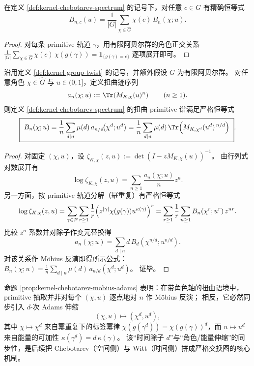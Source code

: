 \begin{proposition}\label{prop:kernel-chebotarev-fourier}
在定义 \ref{def:kernel-chebotarev-spectrum} 的记号下，对任意 $c\in G$ 有精确恒等式
\[
B_{n,c}(u)=\frac{1}{|G|}\sum_{\chi\in\widehat G}\overline{\chi(c)}\,B_n(\chi;u).
\]
\end{proposition}

\begin{proof}
对每条 primitive 轨道 $\gamma$，用有限阿贝尔群的角色正交关系
\(
\frac{1}{|G|}\sum_{\chi\in\widehat G}\overline{\chi(c)}\,\chi(g(\gamma))=\mathbf{1}_{\{g(\gamma)=c\}}
\)
逐项展开即可。
\end{proof}

\begin{proposition}\label{prop:kernel-chebotarev-mobius-adams}
沿用定义 \ref{def:kernel-group-twist} 的记号，并额外假设 \(G\) 为有限阿贝尔群。
对任意角色 \(\chi\in\widehat G\) 与 \(u\in(0,1]\)，定义扭曲迹序列
\[
a_n(\chi;u):=\Tr\!\left(M_{K,\chi}(u)^n\right)\qquad(n\ge 1).
\]
则定义 \ref{def:kernel-chebotarev-spectrum} 的扭曲 primitive 谱满足严格恒等式
\[
\boxed{\ 
B_n(\chi;u)=\frac{1}{n}\sum_{d\mid n}\mu(d)\,a_{n/d}\!\bigl(\chi^{d};u^{d}\bigr)
=\frac{1}{n}\sum_{d\mid n}\mu(d)\,\Tr\!\left(M_{K,\chi^{d}}(u^{d})^{\,n/d}\right)\ }.
\]
\end{proposition}
\begin{proof}
对固定 \((\chi,u)\)，设
\(
\zeta_{K,\chi}(z,u):=\det(I-zM_{K,\chi}(u))^{-1}
\)。
由行列式对数展开有
\[
\log\zeta_{K,\chi}(z,u)
=\sum_{n\ge 1}\frac{a_n(\chi;u)}{n}z^n.
\]
另一方面，按 primitive 轨道分解（幂重复）有严格恒等式
\[
\log\zeta_{K,\chi}(z,u)
=\sum_{\gamma\in\mathcal{P}}\sum_{r\ge 1}\frac{1}{r}\Bigl(z^{|\gamma|}\chi(g(\gamma))u^{\kappa(\gamma)}\Bigr)^r
=\sum_{r\ge 1}\frac{1}{r}\sum_{n\ge 1}B_n(\chi^r;u^r)\,z^{nr}.
\]
比较 \(z^n\) 系数并对除子作变元替换得
\[
a_n(\chi;u)=\sum_{d\mid n} d\,B_d(\chi^{n/d};u^{n/d}).
\]
对该关系作 Möbius 反演即得所示公式：
\(
B_n(\chi;u)=\frac{1}{n}\sum_{d\mid n}\mu(d)\,a_{n/d}(\chi^d;u^d)
\)。
证毕。
\end{proof}

\begin{remark}\label{rem:kernel-chebotarev-mobius-adams-meaning}
命题 \ref{prop:kernel-chebotarev-mobius-adams} 表明：在带角色轴的扭曲语境中，primitive 抽取并非对每个 \((\chi,u)\) 逐点地对 \(n\) 作 Möbius 反演；
相反，它必然同步引入 \(d\)-次 Adams 伸缩
\[
(\chi,u)\longmapsto(\chi^d,u^d),
\]
其中 \(\chi\mapsto\chi^d\) 来自幂重复下的标签幂律 \(\chi(g(\gamma^d))=\chi(g(\gamma))^d\)，而 \(u\mapsto u^d\) 来自能量的可加性 \(\kappa(\gamma^d)=d\,\kappa(\gamma)\)。
该“时间除子 \(d\)”与“角色/能量伸缩”的同步性，是后续把 Chebotarev（空间侧）与 Witt（时间侧）拼成严格交换图的核心机制。
\end{remark}

